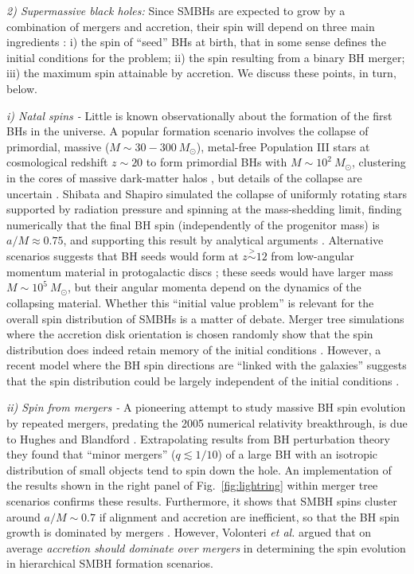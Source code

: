 \documentclass[]{iopart}
\def\gappreq{\!\stackrel{\scriptscriptstyle >}{\scriptscriptstyle \sim}\!}
\begin{document}
\noindent
{\em 2) Supermassive black holes:} Since SMBHs are expected to grow by a
combination of mergers and accretion, their spin will depend on three main
ingredients \cite{Gammie:2003qi}: i) the spin of ``seed'' BHs at birth, that
in some sense defines the initial conditions for the problem; ii) the spin
resulting from a binary BH merger; iii) the maximum spin attainable by
accretion. We discuss these points, in turn, below.

\noindent
{\em i) Natal spins -} Little is known observationally about the formation of
the first BHs in the universe.  A popular formation scenario involves the
collapse of primordial, massive ($M\sim 30-300~M_\odot$), metal-free
Population III stars at cosmological redshift $z\sim 20$ to form primordial
BHs with $M\sim 10^2~M_\odot$, clustering in the cores of massive dark-matter
halos \cite{Madau:2001sc}, but details of the collapse are uncertain
\cite{Ohkubo:2005pu,Suwa:2007nq}.
%
Shibata and Shapiro simulated the collapse of uniformly rotating stars
supported by radiation pressure and spinning at the mass-shedding limit,
finding numerically \cite{Shibata:2002br} that the final BH spin
(independently of the progenitor mass) is $a/M\approx 0.75$, and supporting
this result by analytical arguments \cite{Shapiro:2002kk}. Alternative
scenarios suggests that BH seeds would form at $z\gappreq 12$ from low-angular
momentum material in protogalactic discs
\cite{Koushiappas:2003zn,Begelman:2006db}; these seeds would have larger mass
$M\sim 10^5~M_\odot$, but their angular momenta depend on the dynamics of the
collapsing material.
%
Whether this ``initial value problem'' is relevant for the overall spin
distribution of SMBHs is a matter of debate. Merger tree simulations where the
accretion disk orientation is chosen randomly show that the spin distribution
does indeed retain memory of the initial conditions
\cite{Volonteri:2004cf,Berti:2008af}.  However, a recent model where the BH
spin directions are ``linked with the galaxies'' suggests that the spin
distribution could be largely independent of the initial conditions
\cite{Lagos:2009xr}.

\noindent
{\em ii) Spin from mergers -} A pioneering attempt to study massive BH spin
evolution by repeated mergers, predating the 2005 numerical relativity
breakthrough, is due to Hughes and Blandford
\cite{Hughes:2002ei}. Extrapolating results from BH perturbation theory they
found that ``minor mergers'' ($q\lesssim 1/10$) of a large BH with an
isotropic distribution of small objects tend to spin down the hole.  An
implementation of the results shown in the right panel of
Fig.~\ref{fig:lightring} within merger tree scenarios confirms these
results. Furthermore, it shows that SMBH spins cluster around $a/M\sim 0.7$ if
alignment and accretion are inefficient, so that the BH spin growth is
dominated by mergers \cite{Berti:2008af}. However, Volonteri {\it et al.}
\cite{Volonteri:2004cf,Berti:2008af} argued that on average {\em accretion
  should dominate over mergers} in determining the spin evolution in
hierarchical SMBH formation scenarios.
\end{document}

